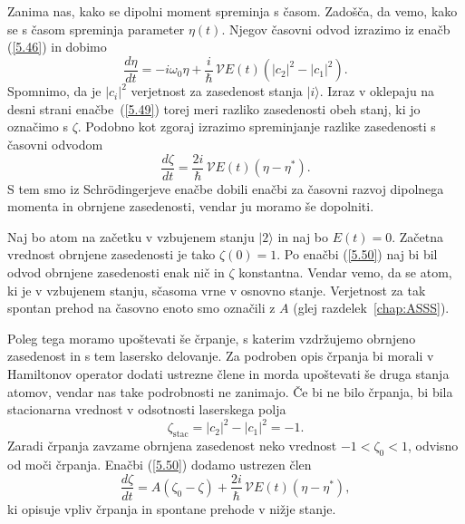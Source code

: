Zanima nas, kako se dipolni moment spreminja s časom. Zadošča, da vemo, kako se 
s časom spreminja parameter $\eta(t)$. Njegov časovni odvod izrazimo
iz enačb (\ref{5.46}) in dobimo
\begin{equation}  
\label{5.49}
\frac{d\eta}{dt}=- i \omega_0\eta+\frac{i}{\hslash}\,\mathcal{V}E(t) \left(|c_2|^2-|c_1|^2\right).
\end{equation}
Spomnimo, da je $|c_i|^2$ verjetnost za zasedenost stanja $|i\rangle$. Izraz v oklepaju
na desni strani enačbe~(\ref{5.49}) torej meri razliko zasedenosti obeh stanj, ki jo označimo
s $\zeta$. Podobno kot zgoraj izrazimo spreminjanje razlike zasedenosti s časovni odvodom 
\begin{equation}  
\label{5.50}
\frac{d\zeta}{dt}=\frac{2i}{\hslash}\, \mathcal{V} E(t)\left(\eta- \eta^{\ast}\right).
\end{equation}
S tem smo iz Schr\"odingerjeve enačbe dobili enačbi za časovni razvoj
dipolnega momenta in obrnjene zasedenosti, vendar ju moramo še dopolniti.

Naj bo atom na začetku v vzbujenem stanju $|2\rangle$ in naj bo $E(t)=0$. Začetna
vrednost obrnjene zasedenosti je tako $\zeta(0)=1$. Po enačbi (\ref{5.50}) naj bi 
bil odvod obrnjene zasedenosti enak nič in $\zeta$ konstantna. 
Vendar vemo, da se atom, ki je v vzbujenem stanju, sčasoma vrne v
osnovno stanje. Verjetnost za tak spontan prehod na časovno enoto smo označili z $A$ (glej 
razdelek~\ref{chap:ASSS}).

Poleg tega moramo upoštevati še črpanje, s katerim
vzdržujemo obrnjeno zasedenost in s tem lasersko delovanje. Za podroben
opis črpanja bi morali v Hamiltonov operator dodati ustrezne člene in
morda upoštevati še druga stanja atomov, vendar nas take podrobnosti 
ne zanimajo. Če bi ne bilo črpanja, bi bila stacionarna vrednost
v odsotnosti laserskega polja
\begin{equation}
 \zeta_{\mathrm{stac}}= |c_2|^2-|c_1|^2 = -1.
\end{equation}
Zaradi črpanja zavzame obrnjena zasedenost neko vrednost $-1<\zeta_0<1$, 
odvisno od moči črpanja. Enačbi (\ref{5.50}) dodamo ustrezen člen
\begin{equation}  
\label{5.51}
\frac{d\zeta}{dt}=A\left(\zeta_0-\zeta\right)+\frac{2i}{\hslash}\,\mathcal{V}E(t)\left(\eta-\eta^{\ast}\right),
\end{equation}
ki opisuje vpliv črpanja in spontane prehode v nižje stanje. 

